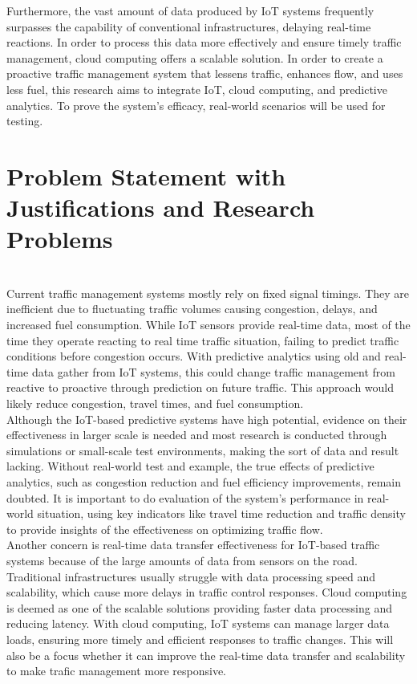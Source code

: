 \documentclass[12pt,a4paper]{article}
\begin{document}
Furthermore, the vast amount of data produced by IoT systems frequently surpasses the capability of conventional infrastructures, delaying real-time reactions. In order to process this data more effectively and ensure timely traffic management, cloud computing offers a scalable solution. In order to create a proactive traffic management system that lessens traffic, enhances flow, and uses less fuel, this research aims to integrate IoT, cloud computing, and predictive analytics. To prove the system's efficacy, real-world scenarios will be used for testing. 

\newpage

\section{Problem Statement with Justifications and Research Problems }\\

Current traffic management systems mostly rely on fixed signal timings. They are inefficient due to fluctuating traffic volumes causing congestion, delays, and increased fuel consumption. While IoT sensors provide real-time data, most of the time they operate reacting to real time traffic situation, failing to predict traffic conditions before congestion occurs. With predictive analytics using old and real-time data gather from IoT systems, this could change traffic management from reactive to proactive through prediction on future traffic. This approach would likely reduce congestion, travel times, and fuel consumption.\\

Although the IoT-based predictive systems have high potential, evidence on their effectiveness in larger scale is needed and most research is conducted through simulations or small-scale test environments, making the sort of data and result lacking. Without real-world test and example, the true effects of predictive analytics, such as congestion reduction and fuel efficiency improvements, remain doubted. It is important to do evaluation of the system's performance in real-world situation, using key indicators like travel time reduction and traffic density to provide insights of the effectiveness on optimizing traffic flow. \\

Another concern is real-time data transfer effectiveness for IoT-based traffic systems because of the large amounts of data from sensors on the road. Traditional infrastructures usually struggle with data processing speed and scalability, which cause more delays in traffic control responses. Cloud computing is deemed as one of the scalable solutions providing faster data processing and reducing latency. With cloud computing, IoT systems can manage larger data loads, ensuring more timely and efficient responses to traffic changes. This will also be a focus whether it can improve the real-time data transfer and scalability to make trafic management more responsive.
\end{document}
